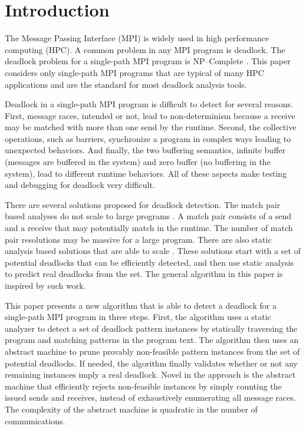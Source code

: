 \section{Introduction}

The Message Passing Interface (MPI) is widely used in high performance computing (HPC). A common problem in any MPI program is deadlock. The deadlock problem for a single-path MPI program is NP--Complete \cite{DBLP:conf/fm/ForejtKNS14}.
This paper considers only single-path MPI programs that are typical of many HPC applications and are the standard for most deadlock analysis tools.  

Deadlock in a single-path MPI program is difficult to detect for several reasons. First, message races, intended or not, lead to non-determinism because a receive may be matched with more than one send by the runtime. Second, the collective operations, such as barriers, synchronize a program in complex ways leading to unexpected behaviors. And finally, the two buffering semantics, infinite buffer (messages are buffered in the system) and zero buffer (no buffering in the system), lead to different runtime behaviors. All of these aspects make testing and debugging for deadlock very difficult. 

There are several solutions proposed for deadlock detection. The match pair based analyses do not scale to large programs \cite{DBLP:conf/ppopp/VakkalankaSGK08, DBLP:conf/sbmf/SharmaGB12, DBLP:conf/fm/ForejtKNS14}. A match pair consists of a send and a receive that may potentially match in the runtime. The number of match pair resolutions may be massive for a large program.
There are also static analysis based solutions that are able to scale \cite{DBLP:conf/sc/SharmaGB12, DBLP:conf/pldi/JoshiPSN09, Subodh:Dissertation}. These solutions start with a set of potential deadlocks that can be efficiently detected, and then use static analysis to predict real deadlocks from the set.
The general algorithm in this paper is inspired by such work.

This paper presents a new algorithm that is able to detect a deadlock for a single-path MPI program in three steps. First, the algorithm uses a static analyzer to detect a set of deadlock pattern instances by statically traversing the program and matching patterns in the program text. The algorithm then uses an abstract machine to prune provably non-feasible pattern instances from the set of potential deadlocks. If needed, the algorithm finally validates whether or not any remaining instances imply a real deadlock. Novel in the approach is the abstract machine that efficiently rejects non-feasible instances by simply counting the issued sends and receives, instead of exhaustively enumerating all message races. The complexity of the abstract machine is quadratic in the number of communications. 

